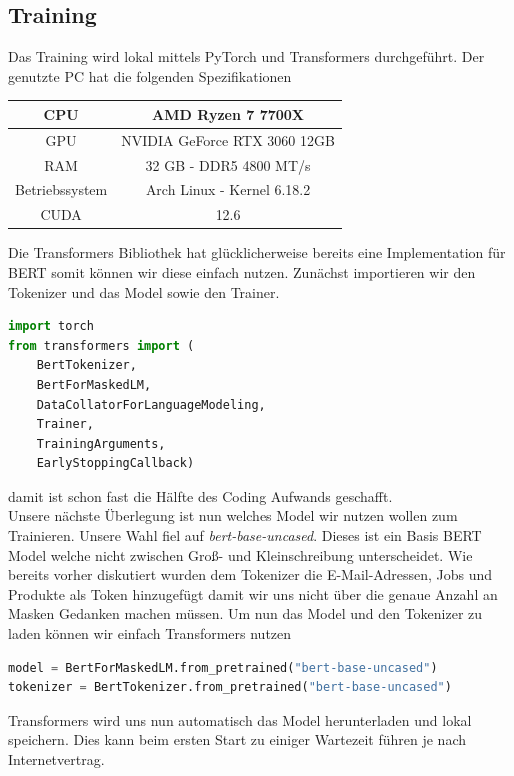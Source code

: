 \documentclass[a4paper, 11pt]{article}          %
\begin{document}
\subsection{Training}
Das Training wird lokal mittels PyTorch und Transformers durchgeführt. Der genutzte PC hat die folgenden Spezifikationen
\begin{center}
    \begin{tabular}{|c|c|}
        \hline
        CPU & AMD Ryzen 7 7700X \\
        \hline
        GPU & NVIDIA GeForce RTX 3060 12GB \\
        \hline
        RAM & 32 GB - DDR5 4800 MT/s \\
        \hline
        Betriebssystem & Arch Linux - Kernel 6.18.2 \\ 
        \hline
        CUDA & 12.6\\
        \hline
    \end{tabular}
\end{center}
Die Transformers Bibliothek hat glücklicherweise bereits eine Implementation für BERT somit können wir diese einfach nutzen. Zunächst importieren wir den Tokenizer und das Model sowie den Trainer. 
\begin{lstlisting}[language = python]
import torch
from transformers import (
    BertTokenizer,
    BertForMaskedLM,
    DataCollatorForLanguageModeling,
    Trainer,
    TrainingArguments,
    EarlyStoppingCallback)
\end{lstlisting}
damit ist schon fast die Hälfte des Coding Aufwands geschafft. 
\medskip\\
Unsere nächste Überlegung ist nun welches Model wir nutzen wollen zum Trainieren. Unsere Wahl fiel auf \emph{bert-base-uncased}. Dieses ist ein Basis BERT Model welche nicht zwischen Groß- und Kleinschreibung unterscheidet. Wie bereits vorher diskutiert wurden dem Tokenizer die E-Mail-Adressen, Jobs und Produkte als Token hinzugefügt damit wir uns nicht über die genaue Anzahl an Masken Gedanken machen müssen. Um nun das Model und den Tokenizer zu laden können wir einfach Transformers nutzen 
\begin{lstlisting}[language = python]
model = BertForMaskedLM.from_pretrained("bert-base-uncased")
tokenizer = BertTokenizer.from_pretrained("bert-base-uncased")
\end{lstlisting}
Transformers wird uns nun automatisch das Model herunterladen und lokal speichern. Dies kann beim ersten Start zu einiger Wartezeit führen je nach Internetvertrag.
\medskip\\
\end{document}
